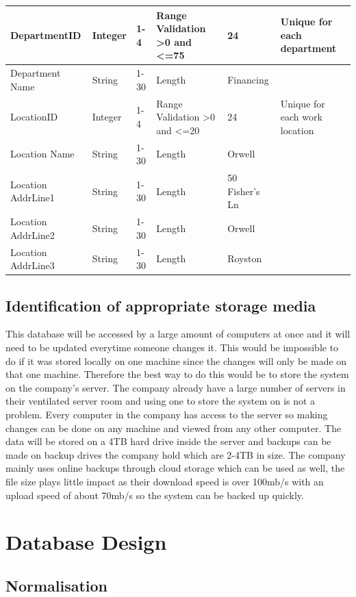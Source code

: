 \begin{center}
\begin{longtable}{|p{2cm}|p{1.14cm}|p{1.1cm}|p{1.7cm}|p{1.7cm}|p{2cm}|}
DepartmentID &Integer				& 1-4				&Range Validation \textgreater0 and \textless=75		& 24		& Unique for each department	\\ \hline
Department Name & String				& 1-30				& Length		& Financing		&	\\ \hline
LocationID &Integer				& 1-4				&Range Validation \textgreater0 and \textless=20		& 	24	& Unique for each work location		\\ \hline
Location Name & String				& 1-30				& Length		&	Orwell	 &  \\ \hline
Location AddrLine1 & String				& 1-30				& Length		&	50 Fisher's Ln	 &  \\ \hline
Location AddrLine2 & String				& 1-30				& Length		&	Orwell	 &  \\ \hline
Location AddrLine3  & String				& 1-30				& Length		&	Royston 	 &  \\ \hline
\end{longtable}
\end{center}

\newpage
\subsection{Identification of appropriate storage media}

This database will be accessed by a large amount of computers at once and it will need to be updated everytime someone changes it. This would be impossible to do if it was stored locally on one machine since the changes will only be made on that one machine. Therefore the best way to do this would be to store the system on the company's server. The company already have a large number of servers in their ventilated server room and using one to store the system on is not a problem. Every computer in the company has access to the server so making changes can be done on any machine and viewed from any other computer. The data will be stored on a 4TB hard drive inside the server and backups can be made on backup drives the company hold which are 2-4TB in size. The company mainly uses online backups through cloud storage which can be used as well, the file size plays little impact as their download speed is over 100mb/s with an upload speed of about 70mb/s so the system can be backed up quickly.
\section{Database Design}

\subsection{Normalisation}

